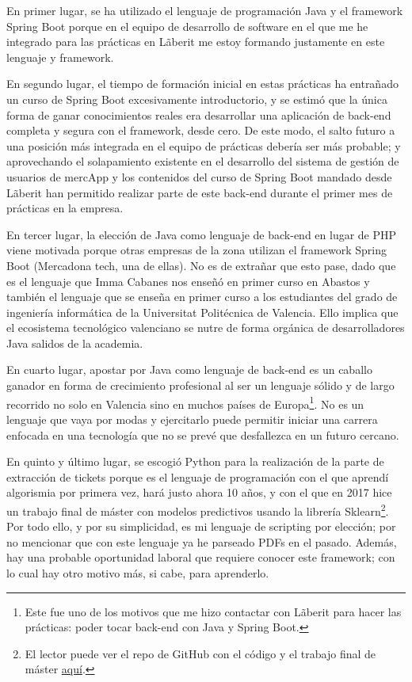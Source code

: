 \documentclass[a4paper,12pt]{report}
\begin{document}
		En primer lugar, se ha utilizado el lenguaje de programación Java y el framework Spring Boot porque en el equipo de desarrollo de software en el que me he integrado para las prácticas en Lãberit me estoy formando justamente en este lenguaje y framework. 
		
		En segundo lugar, el tiempo de formación inicial en estas prácticas ha entrañado un curso de Spring Boot excesivamente introductorio, y se estimó que la única forma de ganar conocimientos reales era desarrollar una aplicación de back-end completa y segura con el framework, desde cero. De este modo, el salto futuro a una posición más integrada en el equipo de prácticas debería ser más probable; y aprovechando el solapamiento existente en el desarrollo del sistema de gestión de usuarios de mercApp y los contenidos del curso de Spring Boot mandado desde Lãberit han permitido realizar parte de este back-end durante el primer mes de prácticas en la empresa.
			
		En tercer lugar, la elección de Java como lenguaje de back-end en lugar de PHP viene motivada porque otras empresas de la zona utilizan el framework Spring Boot (Mercadona tech, una de ellas). No es de extrañar que esto pase, dado que es el lenguaje que Imma Cabanes nos enseñó en primer curso en Abastos y también el lenguaje que se enseña en primer curso a los estudiantes del grado de ingeniería informática de la Universitat Politécnica de Valencia. Ello implica que el ecosistema tecnológico valenciano se nutre de forma orgánica de desarrolladores Java salidos de la academia.
		
		En cuarto lugar, apostar por Java como lenguaje de back-end es un caballo ganador en forma de crecimiento profesional al ser un lenguaje sólido y de largo recorrido no solo en Valencia sino en muchos países de Europa\footnote{Este fue uno de los motivos que me hizo contactar con Lãberit para hacer las prácticas: poder tocar back-end con Java y Spring Boot.}. No es un lenguaje que vaya por modas y ejercitarlo puede permitir iniciar una carrera enfocada en una tecnología que no se prevé que desfallezca en un futuro cercano.
		
		En quinto y último lugar, se escogió Python para la realización de la parte de extracción de tickets porque es el lenguaje de programación con el que aprendí algorismia por primera vez, hará justo ahora 10 años, y con el que en 2017 hice un trabajo final de máster con modelos predictivos usando la librería Sklearn\footnote{El lector puede ver el repo de GitHub con el código y el trabajo final de máster \href{https://github.com/blackcub3s/MSc-FinalThesis}{aquí}.}. Por todo ello, y por su simplicidad, es mi lenguaje de scripting por elección; por no mencionar que con este lenguaje ya he parseado PDFs en el pasado. Además, hay una probable oportunidad laboral que requiere conocer este framework; con lo cual hay otro motivo más, si cabe, para aprenderlo.
		
\end{document}
